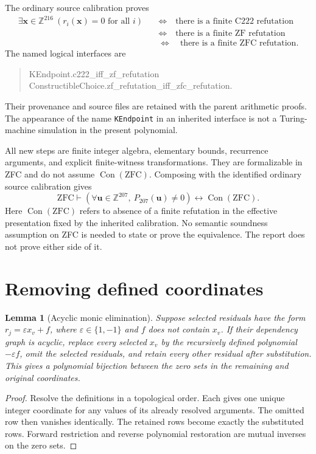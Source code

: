 \documentclass[10pt,letterpaper]{article}
\newtheorem{lemma}[theorem]{Lemma}
\theoremstyle{remark}\newtheorem{remark}[theorem]{Remark}
\newcommand{\Z}{\mathbb Z}\newcommand{\Q}{\mathbb Q}\newcommand{\N}{\mathbb N}
\newcommand{\Con}{\operatorname{Con}}
\begin{document}
The ordinary source calibration proves
\begin{align*}
 \exists\mathbf x\in\Z^{216}\ (r_i(\mathbf x)=0\text{ for all }i)
 &\quad\Longleftrightarrow\quad
 \text{there is a finite C222 refutation}\\
 &\quad\Longleftrightarrow\quad
 \text{there is a finite ZF refutation}\\
 &\quad\Longleftrightarrow\quad
 \text{there is a finite ZFC refutation}.
\end{align*}
The named logical interfaces are
\begin{quote}\small\ttfamily
KEndpoint.c222\_iff\_zf\_refutation\\
ConstructibleChoice.zf\_refutation\_iff\_zfc\_refutation.
\end{quote}
Their provenance and source files are retained with the parent arithmetic
proofs. The appearance of the name \texttt{KEndpoint} in an inherited
interface is not a Turing-machine simulation in the present polynomial.

All new steps are finite integer algebra, elementary bounds, recurrence
arguments, and explicit finite-witness transformations. They are
formalizable in ZFC and do not assume $\Con(\mathrm{ZFC})$.
Composing with the identified ordinary source calibration gives
\begin{equation}
 \mathrm{ZFC}\vdash
 \left(\forall\mathbf u\in\Z^{207},\ P_{207}(\mathbf u)\ne0\right)
 \longleftrightarrow\Con(\mathrm{ZFC}).\label{eq:logic}
\end{equation}
Here $\Con(\mathrm{ZFC})$ refers to absence of a finite refutation in
the effective presentation fixed by the inherited calibration. No
semantic soundness assumption on ZFC is needed to state or prove the
equivalence. The report does not prove either side of it.

\section{Removing defined coordinates}

\begin{lemma}[Acyclic monic elimination]\label{lem:eliminate}
Suppose selected residuals have the form
$r_j=\varepsilon x_v+f$, where $\varepsilon\in\{1,-1\}$ and $f$
does not contain $x_v$. If their dependency graph is acyclic, replace
every selected $x_v$ by the recursively defined polynomial
$-\varepsilon f$, omit the selected residuals, and retain every other
residual after substitution. This gives a polynomial bijection between
the zero sets in the remaining and original coordinates.
\end{lemma}
\begin{proof}
Resolve the definitions in a topological order. Each gives one unique
integer coordinate for any values of its already resolved arguments.
The omitted row then vanishes identically. The retained rows become
exactly the substituted rows. Forward restriction and reverse polynomial
restoration are mutual inverses on the zero sets.
\end{proof}
\end{document}
